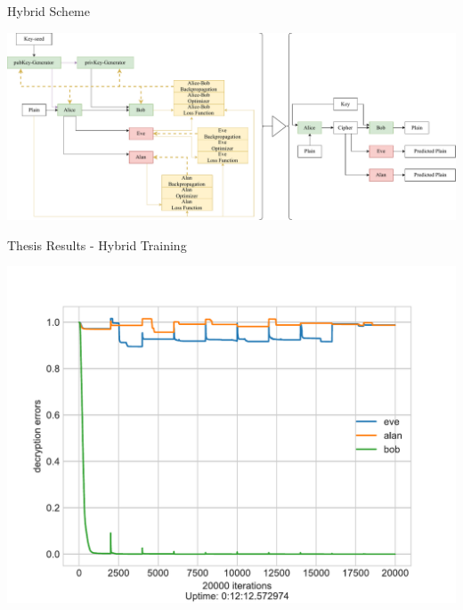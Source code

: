 \documentclass{beamer}
\begin{document}
		\begin{frame}{Hybrid Scheme}
			\begin{center}
				\includegraphics[width=\textwidth, height=0.8\textheight]{hybridScheme-present}
			\end{center}
		\end{frame}
		\begin{frame}{Thesis Results - Hybrid Training}
			\begin{center}
				\includegraphics[height=0.9\textheight]{neurencoder-hybrid-training}
			\end{center}
		\end{frame}
\end{document}
